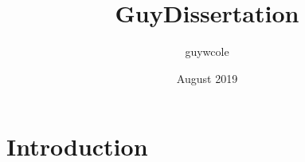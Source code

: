 \documentclass{article}
\title{GuyDissertation}
\author{guywcole }
\date{August 2019}
\begin{document}
\maketitle

\section{Introduction}
\end{document}
